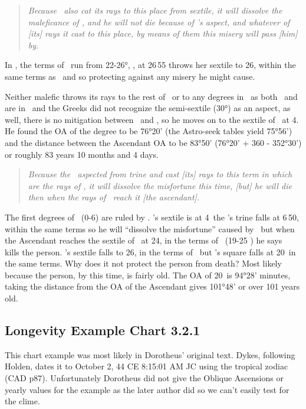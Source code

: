 \begin{quote}
\textsl{Because  \Venus\, also cat its rays to this place from sextile, it will dissolve the maleficance of \Mars, and he will not die because of \Venus's aspect, and whatever of [its] rays it cast to this place, by means of them this misery will pass [him] by.
}
\end{quote}

In \Taurus, the terms of \Saturn\, run from 22-26°, \Venus, at 26\Pisces\,55 throws her sextile to 26\Taurus, within the same terms as \Mars\, and so protecting against any misery he might cause.

Neither   malefic throws its rays to the rest of \Taurus\, or to any degrees in \Gemini\, as both \Saturn\, and \Mars\, are in \Taurus\, and the Greeks did not recognize the semi-sextile (30°) as an aspect, as well, there is no mitigation between \Taurus\, and \Gemini, so he moves on to the sextile of \Saturn\, at 4. He found the OA of the degree to be 76°20' (the Astro-seek tables yield 75°56') and the distance between the Ascendant OA to be 83°50' (76°20' + 360 - 352°30') or roughly 83 years 10 months and 4 days.
\begin{quote}
\textsl{Because the \Sun\, aspected from trine and cast [its] rays to this term in which are the rays of \Saturn, it will dissolve the misfortune this time, [but] he will die then when the rays of \Mars\, reach it [the ascendant].}
\end{quote}

The first degrees of \Cancer\, (0-6) are ruled by \Mars. \Saturn's sextile is at 4\Cancer\, the \Sun's trine falls at 6\Cancer\,50, within the same terms so he will ``dissolve the misfortune'' caused by \Saturn\, but when the Ascendant reaches the sextile of \Mars\, at 24\Cancer, in the terms of \Jupiter\, (19-25 \Cancer) he says  \Mars\, kills the person. \Venus's sextile falls to 26\Cancer, in the terms of \Saturn\, but \Jupiter's square falls at 20\Cancer\, in the same terms. Why does it not protect the person from death?  Most likely because the person, by this time, is fairly old. The OA of 20\Cancer\, is 94°28' minutes, taking the distance from the OA of the Ascendant gives 101°48' or over 101 years old.

\newpage
\subsection{Longevity Example Chart 3.2.1}
\vspace{0.5em}
\begin{mdframed}[backgroundcolor=cyan!5, rightmargin=1em, leftmargin=1em]
This chart example was most likely in Dorotheus' original text. Dykes, following Holden, dates it to October 2, 44 CE 8:15:01 AM JC using the tropical zodiac (CAD p87).  Unfortunately Dorotheus did not give the Oblique Ascensions or yearly values for the example as the later author did so we can't easily test for the clime.
\end{mdframed}

